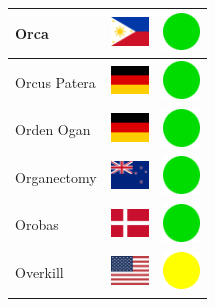 \documentclass[12pt, a4paper, twoside]{report}
\begin{document}
\begin{center}
\begin{longtable}{|p{5cm}|p{2cm}|p{2cm}|}
Orca & \includegraphics[width=1cm]{4x3/ph} & \includegraphics[width=1cm]{likes/y} \\ \hline
Orcus Patera & \includegraphics[width=1cm]{4x3/de} & \includegraphics[width=1cm]{likes/y} \\ \hline
Orden Ogan & \includegraphics[width=1cm]{4x3/de} & \includegraphics[width=1cm]{likes/y} \\ \hline
Organectomy & \includegraphics[width=1cm]{4x3/nz} & \includegraphics[width=1cm]{likes/y} \\ \hline
Orobas & \includegraphics[width=1cm]{4x3/dk} & \includegraphics[width=1cm]{likes/y} \\ \hline
Overkill & \includegraphics[width=1cm]{4x3/us} & \includegraphics[width=1cm]{likes/m} \\ \hline

\end{longtable}
\end{center}
\end{document}
